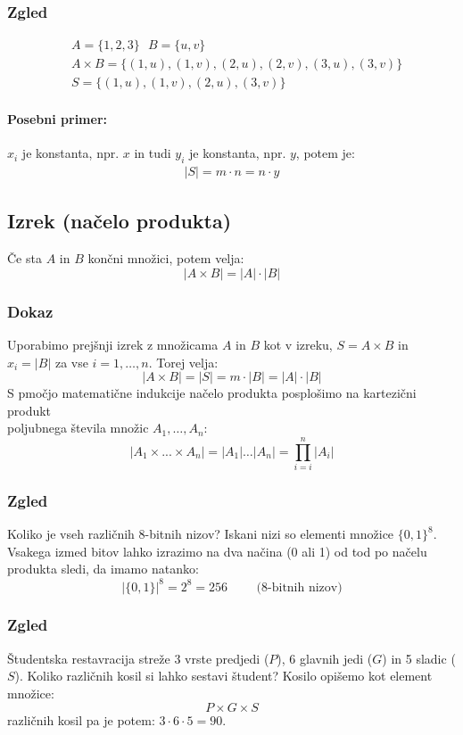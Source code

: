 \subsubsection{Zgled}
\begin{align*}
    & A = \{ 1, 2, 3 \} \text{ } B = \{u, v\} \\[1em]
    & A \times B = \{ (1, u), (1, v), (2, u), (2, v), (3, u), (3,v) \} \\[1em]
    & S = \{ (1, u), (1, v), (2, u), (3, v) \}
\end{align*}


\paragraph{Posebni primer:}
$x_i$ je konstanta, npr. $x$ in tudi $y_i$ je konstanta, npr. $y$, potem je:
\begin{align*}
    |S| = m \cdot n = n \cdot y    
\end{align*}


\subsection{Izrek (načelo produkta)}
Če sta $A$ in $B$ končni množici, potem velja:
$$
|A \times B| = |A| \cdot |B|
$$

\subsubsection{Dokaz}
Uporabimo prejšnji izrek z množicama $A$ in $B$ kot v izreku, $S = A \times B$ in \\
$x_i = |B|$ za vse $i = 1, \dots, n$. Torej velja:
$$
|A \times B| = |S| = m \cdot |B| = |A| \cdot |B| 
$$
S pmočjo matematične indukcije načelo produkta posplošimo na kartezični produkt \\
poljubnega števila množic $A_1, \dots, A_n$:
$$
|A_1 \times ... \times A_n| = |A_1| \dots |A_n| = \prod_{i = i}^{n} |A_i|
$$


\subsubsection{Zgled}
Koliko je vseh različnih 8-bitnih nizov? Iskani nizi so elementi množice $\{0, 1\}^8$. Vsakega izmed bitov lahko izrazimo na dva načina (0 ali 1) od tod po načelu produkta sledi, da imamo natanko:
$$
|\{0, 1\}|^8 = 2^8 = 256 \text{ } \text{ }\text{ } \text{ (8-bitnih nizov)}
$$

\subsubsection{Zgled}
Študentska restavracija streže 3 vrste predjedi ($P$), 6 glavnih jedi ($G$) in 5 sladic ($S$). Koliko različnih kosil si lahko sestavi študent? Kosilo opišemo kot element množice:
$$
P \times G \times S
$$
različnih kosil pa je potem: $3 \cdot 6 \cdot 5 = 90$.



